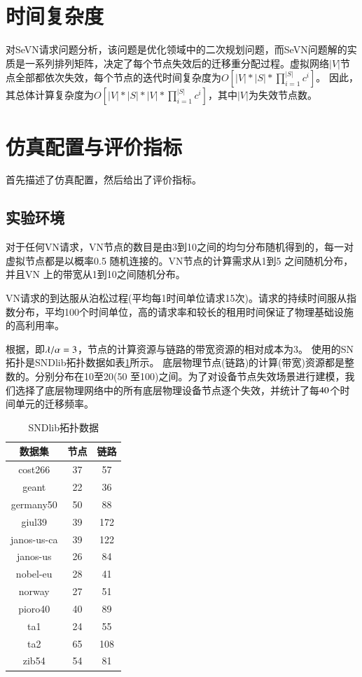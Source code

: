 \section{时间复杂度}
对SeVN请求问题分析，该问题是优化领域中的二次规划问题，而SeVN问题解的实质是一系列排列矩阵，决定了每个节点失效后的迁移重分配过程。虚拟网络$|V|$节点全部都依次失效，每个节点的迭代时间复杂度为$O[|V|*|S|*\prod_{i=1}^{|S|}c^i]$。 因此，其总体计算复杂度为$O[|V|*|S|*|V|*\prod_{i=1}^{|S|}c^i]$，其中$|V|$为失效节点数。


\section{仿真配置与评价指标}
首先描述了仿真配置，然后给出了评价指标。
\subsection{实验环境}
对于任何VN请求，VN节点的数目是由3到10之间的均匀分布随机得到的，每一对虚拟节点都是以概率0.5 随机连接的。VN节点的计算需求从1到5 之间随机分布，并且VN 上的带宽从1到10之间随机分布。

VN请求的到达服从泊松过程(平均每1时间单位请求15次)。请求的持续时间服从指数分布，平均100个时间单位，高的请求率和较长的租用时间保证了物理基础设施的高利用率。

根据\cite{yu2010survivable}，即$\lambda/\alpha=3$，节点的计算资源与链路的带宽资源的相对成本为3。 使用的SN 拓扑是SNDlib拓扑数据\cite{orlowski2010sndlib}如表\ref{tab:SNDlibTopo}所示。 底层物理节点(链路)的计算(带宽)资源都是整数的。分别分布在10至20(50 至100)之间。为了对设备节点失效场景进行建模，我们选择了底层物理网络中的所有底层物理设备节点逐个失效，并统计了每$40$个时间单元的迁移频率。
\begin{table}[htb]
\centering
\caption{SNDlib拓扑数据}\label{tab:SNDlibTopo}
\begin{tabular}{|c|c|c|}
  \hline
  数据集 & 节点 & 链路 \\
  \hline
  cost266& 37& 57\\
  geant& 22& 36\\
  germany50& 50& 88\\
  giul39& 39& 172\\
  janos-us-ca& 39& 122\\
  janos-us& 26& 84\\
  nobel-eu& 28& 41\\
  norway& 27& 51\\
  pioro40& 40& 89\\
  ta1& 24& 55\\
  ta2& 65& 108\\
  zib54& 54& 81\\
  \hline

\end{tabular}
\end{table}

